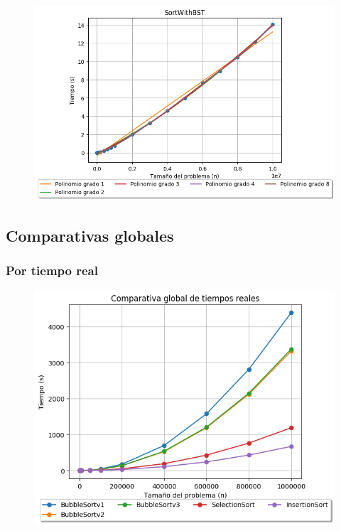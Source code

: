 \documentclass[12pt, fleqn]{report}                             %
\theoremstyle{break}                                            %
\begin{document}
    	        \begin{figure}[H]
    	            \centering
    	            \includegraphics[scale=0.86]{graphics/SortWithBST-Polynomials.png}
    	        \end{figure}
    	        
    	        
	    \subsection{Comparativas globales}
	    
	        \subsubsection{Por tiempo real}
	            \begin{figure}[H]
    	            \centering
    	            \includegraphics[scale=0.78]{graphics/globalComparativeTimes2.png}
    	        \end{figure}
    	        
\end{document}
